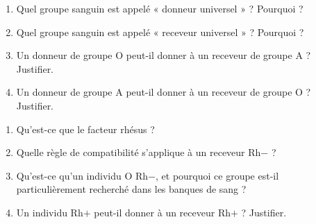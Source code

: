 \begin{enumerate}[label=\arabic*)]
\item Quel groupe sanguin est appelé « donneur universel » ? Pourquoi ?
\item Quel groupe sanguin est appelé « receveur universel » ? Pourquoi ?
\item Un donneur de groupe O peut-il donner à un receveur de groupe A ? Justifier.
\item Un donneur de groupe A peut-il donner à un receveur de groupe O ? Justifier.
\end{enumerate}

\begin{enumerate}[label=\arabic*)]
\item Qu'est-ce que le facteur rhésus ?
\item Quelle règle de compatibilité s'applique à un receveur Rh$-$ ?
\item Qu'est-ce qu'un individu O Rh$-$, et pourquoi ce groupe est-il particulièrement
recherché dans les banques de sang ?
\item Un individu Rh$+$ peut-il donner à un receveur Rh$+$ ? Justifier.
\end{enumerate}

